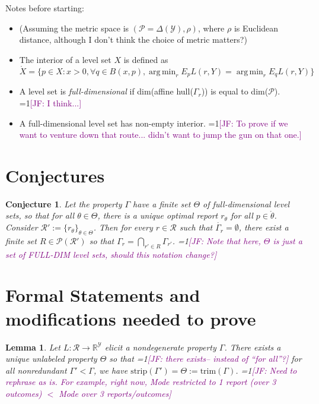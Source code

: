 \documentclass[12pt]{article}
\newcommand{\Comments}{1}
\newcommand{\mynote}[2]{\ifnum\Comments=1\textcolor{#1}{#2}\fi}
\newcommand{\jessie}[1]{\mynote{purple}{[JF: #1]}}
\newcommand{\reals}{\mathbb{R}}
\renewcommand{\P}{\mathcal{P}}
\newcommand{\R}{\mathcal{R}}
\newcommand{\Y}{\mathcal{Y}}
\newcommand{\inter}[1]{\mathring{#1}}%
\newcommand{\strip}{\text{strip}}
\DeclareMathOperator*{\argmin}{arg\,min}
\newtheorem{lemma}{Lemma}
\newtheorem{conjecture}{Conjecture}
\begin{document}
Notes before starting:
\begin{itemize}
\item (Assuming the metric space is $(\P = \Delta(\Y), \rho)$, where $\rho$ is Euclidean distance, although I don't think the choice of metric matters?)
\item The interior of a level set $X$ is defined as $\inter{X} = \{p \in X: x > 0,  \forall q \in B(x,p), \argmin_rE_p L(r,Y) = \argmin_r E_q L(r,Y)\}$
\item A level set is \emph{full-dimensional} if dim(affine hull($\Gamma_r$)) is equal to dim($\P$). \jessie{I think...}
\item A full-dimensional level set has non-empty interior. \jessie{To prove if we want to venture down that route... didn't want to jump the gun on that one.}
\end{itemize}

\section{Conjectures}

\begin{conjecture}\label{conj:intersect-lev-sets}
  Let the property $\Gamma$ have a finite set $\Theta$ of full-dimensional level sets, so that for all $\theta \in \Theta$,  there is a unique optimal report $r_\theta$ for all $p \in \inter{\theta}$.
  Consider $\R' := \{ r_\theta\}_{\theta \in \Theta}$.
  Then for every $r \in \R$ such that $\inter{\Gamma_r} = \emptyset$, there exist a finite set $R \in \mathscr{P}(\R')$ so that $\Gamma_r = \bigcap_{r' \in R} \Gamma_{r'}$.
\jessie{Note that here, $\Theta$ is just a set of FULL-DIM level sets, should this notation change?}
\end{conjecture}


\section{Formal Statements and modifications needed to prove}


\begin{lemma}
  Let $L: \R \to \reals^\Y$ elicit a nondegenerate property $\Gamma$.
There exists a unique unlabeled property $\Theta$ so that \jessie{there exists-- instead of ``for all''?} for all nonredundant $\Gamma' < \Gamma$, we have $\strip(\Gamma') = \Theta := \text{trim}(\Gamma)$.
\jessie{Need to rephrase as is.  For example, right now, Mode restricted to 1 report (over 3 outcomes) $<$ Mode over 3 reports/outcomes}
\end{lemma}
\end{document}
